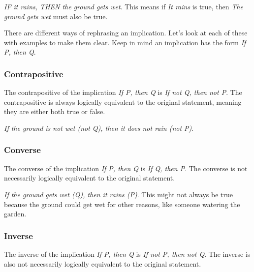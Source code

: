 \documentclass{article}
\theoremstyle{mytheoremstyle}
\theoremstyle{mytheoremstyle}
\theoremstyle{myexamplestyle}
\begin{document}
\begin{example}
    \emph{IF it rains, THEN the ground gets wet}. This means if
    \emph{It rains} is true, then \emph{The ground gets wet} must
    also be true.
\end{example}

There are different ways of rephrasing an implication. Let's look at
each of these with examples to make them clear. Keep in mind an implication has the form \emph{If P, then Q}.

\subsubsection{Contrapositive}
\begin{definition}
    The contrapositive of the implication \emph{If P, then Q} is
    \emph{If not Q, then not P}. The contrapositive is always
    logically equivalent to the original statement, meaning they are
    either both true or false.
\end{definition}

\begin{example}
    \emph{If the ground is not wet (not Q), then it does not rain (not P)}.
\end{example}

\subsubsection{Converse}

\begin{definition}
    The converse of the implication \emph{If P, then Q} is \emph{If
        Q, then P}. The converse is not necessarily logically equivalent
    to the original statement.
\end{definition}

\begin{example}
    \emph{If the ground gets wet (Q), then it rains (P)}. This might
    not always be true because the ground could get wet for other
    reasons, like someone watering the garden.
\end{example}

\newpage

\subsubsection{Inverse}

\begin{definition}
    The inverse of the implication \emph{If P, then Q} is \emph{If not P, then not Q}. The inverse is also not necessarily logically equivalent to the original statement.
\end{definition}
\end{document}

